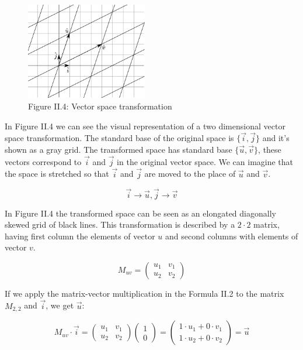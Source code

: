 \begin{figure}[htbp]
    \begin{center}
        \includegraphics[width=150pt]{../img/ii-matrix.png}
        \caption{Figure II.4: Vector space transformation}
    \end{center}
\end{figure}


In Figure II.4 we can see the visual representation of a two dimensional vector space transformation. The standard base of the original space is \(\{\vec i, \vec j\}\) and it's shown as a gray grid. The transformed space has standard base \(\{\vec u, \vec v\}\), these vectors correspond to \(\vec i\) and \(\vec j\) in the original vector space. We can imagine that the space is stretched so that \(\vec i\) and \(\vec j\) are moved to the place of \(\vec u\) and \(\vec v\).

\[\vec i \rightarrow \vec u, \vec j \rightarrow \vec v\]

In Figure II.4 the transformed space can be seen as an elongated diagonally skewed grid of black lines. This transformation is described by a \(2 \cdot 2\) matrix, having first column the elements of vector \(u\) and second columns with elements of vector \(v\).

\[M_{uv} = \begin{pmatrix}
  u_{1} & v_{1} \\
  u_{2} & v_{2}
 \end{pmatrix}\]

If we apply the matrix-vector multiplication in the Formula II.2 to the matrix \(M_{2,2}\) and \(\vec i\), we get \(\vec u\):

\[M_{uv} \cdot \vec i = \begin{pmatrix}
  u_{1} & v_{1} \\
  u_{2} & v_{2}
 \end{pmatrix} \begin{pmatrix} 1 \\ 0 \end{pmatrix} =
 \begin{pmatrix} 1 \cdot u_{1} + 0 \cdot v_{1} \\ 1 \cdot u_{2} + 0 \cdot v_{2} \end{pmatrix} = \vec u\]

